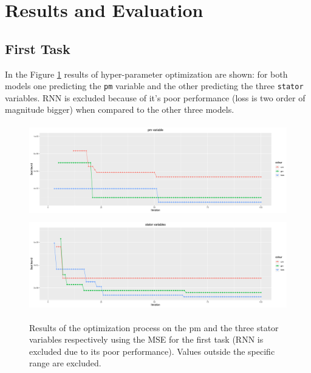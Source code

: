 \section{Results and Evaluation}
 
\subsection{First Task}
In the Figure \ref{fig:automl_mse} results of hyper-parameter optimization are shown: for both models one predicting the \verb|pm| variable and the other predicting the three \verb|stator| variables. RNN is excluded because of it's poor performance (loss is two order of magnitude bigger) when compared to the other three models.
\begin{figure}[!h]
    \centering
    \includegraphics[width=\linewidth, height=4cm]{imgs/comparison_MSE.png}
    \includegraphics[width=\linewidth, height=4cm]{imgs/comparison_MSE_stator.png}
    \caption{Results of the optimization process on the pm and the three stator variables respectively using the MSE for the first task (RNN is excluded due to its poor performance). Values outside the specific range are excluded.}
    \label{fig:automl_mse}
\end{figure}\\
 
